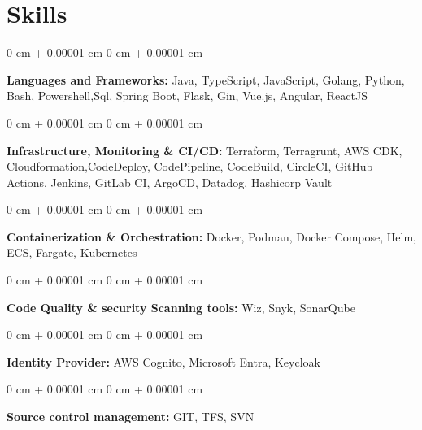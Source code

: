 \documentclass[11pt, letterpaper]{article}
\newenvironment{onecolentry}{
    \begin{adjustwidth}{
        0 cm + 0.00001 cm
    }{
        0 cm + 0.00001 cm
    }
}{
    \end{adjustwidth}
} %
\begin{document}
    

      \section{Skills}

       \begin{onecolentry}
            \textbf{Languages and Frameworks:} Java,
            TypeScript, JavaScript, Golang, Python, Bash, Powershell,Sql, Spring Boot, Flask, Gin, Vue.js, Angular, ReactJS
        \end{onecolentry}

        \vspace{0.05 cm}
   \begin{onecolentry}
            \textbf{Infrastructure, Monitoring \& CI\//CD:} Terraform, Terragrunt, AWS CDK, Cloudformation,CodeDeploy, CodePipeline, CodeBuild, CircleCI, GitHub Actions, Jenkins, GitLab CI, ArgoCD, Datadog, Hashicorp Vault \end{onecolentry}

        \vspace{0.05 cm}
   \begin{onecolentry}
            \textbf{Containerization \& Orchestration:} Docker, Podman, Docker Compose, Helm,
            ECS, Fargate, Kubernetes
            
        \end{onecolentry}
        \vspace{0.05 cm}

       \begin{onecolentry}
            \textbf{Code Quality \& security Scanning tools:} Wiz, Snyk, SonarQube

            
        \end{onecolentry}    
    
        \vspace{0.05 cm}

       \begin{onecolentry}
            \textbf{Identity Provider:} AWS Cognito, Microsoft Entra, Keycloak

            
        \end{onecolentry}       

        \vspace{0.05 cm}

       \begin{onecolentry}
            \textbf{Source control management:} GIT, TFS, SVN

            
        \end{onecolentry}  
        \vspace{0.05 cm}
\end{document}
